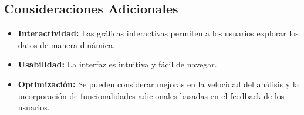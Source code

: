 \subsection*{Consideraciones Adicionales}

\begin{itemize}
    \item \textbf{Interactividad:} Las gráficas interactivas permiten a los usuarios explorar los datos de manera dinámica.
    \item \textbf{Usabilidad:} La interfaz es intuitiva y fácil de navegar.
    \item \textbf{Optimización:} Se pueden considerar mejoras en la velocidad del análisis y la incorporación de funcionalidades adicionales basadas en el feedback de los usuarios.
\end{itemize}

